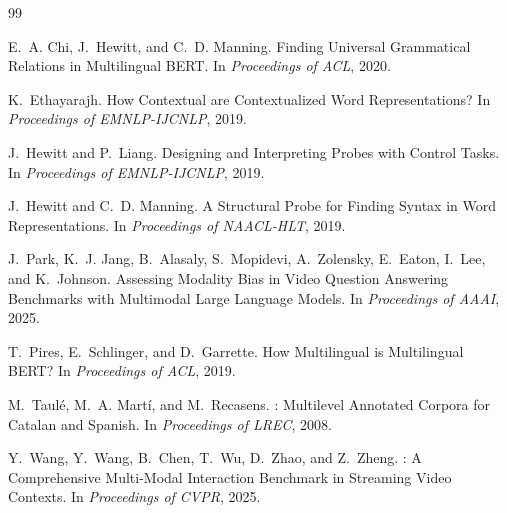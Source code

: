 \documentclass[11pt,a4paper]{article}
\begin{document}

\begin{thebibliography}{99}

E.~A. Chi, J.~Hewitt, and C.~D. Manning.
\newblock Finding Universal Grammatical Relations in Multilingual {BERT}.
\newblock In \emph{Proceedings of ACL}, 2020.

K.~Ethayarajh.
\newblock How Contextual are Contextualized Word Representations?
\newblock In \emph{Proceedings of EMNLP-IJCNLP}, 2019.

J.~Hewitt and P.~Liang.
\newblock Designing and Interpreting Probes with Control Tasks.
\newblock In \emph{Proceedings of EMNLP-IJCNLP}, 2019.

J.~Hewitt and C.~D. Manning.
\newblock A Structural Probe for Finding Syntax in Word Representations.
\newblock In \emph{Proceedings of NAACL-HLT}, 2019.

J.~Park, K.~J. Jang, B.~Alasaly, S.~Mopidevi, A.~Zolensky, E.~Eaton,
I.~Lee, and K.~Johnson.
\newblock Assessing Modality Bias in Video Question Answering Benchmarks
with Multimodal Large Language Models.
\newblock In \emph{Proceedings of AAAI}, 2025.

T.~Pires, E.~Schlinger, and D.~Garrette.
\newblock How Multilingual is Multilingual {BERT}?
\newblock In \emph{Proceedings of ACL}, 2019.

M.~Taul\'e, M.~A. Mart\'i, and M.~Recasens.
: Multilevel Annotated Corpora for Catalan and Spanish.
\newblock In \emph{Proceedings of LREC}, 2008.

Y.~Wang, Y.~Wang, B.~Chen, T.~Wu, D.~Zhao, and Z.~Zheng.
: A Comprehensive Multi-Modal Interaction Benchmark
in Streaming Video Contexts.
\newblock In \emph{Proceedings of CVPR}, 2025.

\end{thebibliography}
\end{document}
